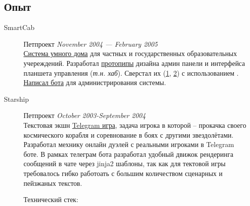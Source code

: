 \documentclass[margin,line]{resume}
\begin{document}
\begin{resume}
\section{\mysidestyle Опыт}\vspace{2mm}

\begin{description}

  \item[SmartCab]\small{Петпроект \hfill
    \textsl{November 2004 — February 2005}}\\
    \href{https://github.com/smart-cab}{Система умного дома} для
    частных и государственных образовательных учереждений. Разработал
    \href{https://www.figma.com/design/8H1tFpxgmIDV1xp06ndi73/SmartCab?node-id=0-1&p=f}{протопипы}
    дизайна админ панели и интерфейса планшета управления
    (\textit{т.н. хаб}). Сверстал их
    (\href{https://github.com/smart-cab/smartcab-hub/tree/main/frontend}{1},
    \href{https://github.com/smart-cab/smartcab-dashboard/tree/main/frontend}{2})
    с использованием .
    \href{https://github.com/smart-cab/smartcab-bot}{Написал бота}
    для администрирования системы.

    \vspace{3mm}

  \item[Starship]\small{Петпроект
    \hfill \textsl{October 2003-September 2004\vspace{2mm}}}\\
    Текстовая экшн \href{https://github.com/starship-crew}{Telegram
    игра}, задача игрока в которой – прокачка своего космического
    корабля и соревнование в боях с другими звездолётами. Разработал
    мехнику онлайн дуэлей с реальными игроками в Telegram боте. В
    рамках телеграм бота разработал удобный движок рендеринга
    сообщений в чате через jinja2 шаблоны, так как для тектовой игры
    требовалось гибко работоать с большим количеством сценарных и
    пейзжаных текстов.

    Технический стек:


\end{description}
\end{resume}
\end{document}
